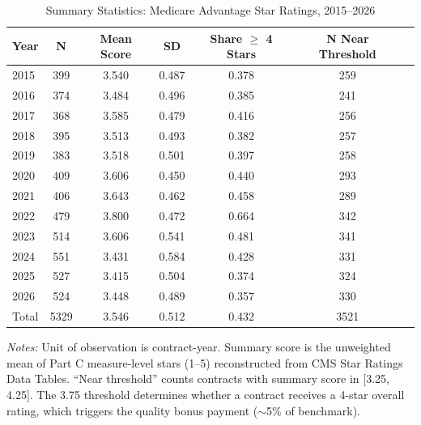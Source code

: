 \begin{table}[t]
\centering
\caption{Summary Statistics: Medicare Advantage Star Ratings, 2015--2026}
\label{tab:summary}
\begin{threeparttable}
\begin{tabular}{lcccccc}
\hline\hline
Year & N & Mean Score & SD & Share $\geq$ 4 Stars & N Near Threshold \\
\hline
2015 & 399 & 3.540 & 0.487 & 0.378 & 259 \\
2016 & 374 & 3.484 & 0.496 & 0.385 & 241 \\
2017 & 368 & 3.585 & 0.479 & 0.416 & 256 \\
2018 & 395 & 3.513 & 0.493 & 0.382 & 257 \\
2019 & 383 & 3.518 & 0.501 & 0.397 & 258 \\
2020 & 409 & 3.606 & 0.450 & 0.440 & 293 \\
2021 & 406 & 3.643 & 0.462 & 0.458 & 289 \\
2022 & 479 & 3.800 & 0.472 & 0.664 & 342 \\
2023 & 514 & 3.606 & 0.541 & 0.481 & 341 \\
2024 & 551 & 3.431 & 0.584 & 0.428 & 331 \\
2025 & 527 & 3.415 & 0.504 & 0.374 & 324 \\
2026 & 524 & 3.448 & 0.489 & 0.357 & 330 \\
\hline
Total & 5329 & 3.546 & 0.512 & 0.432 & 3521 \\
\hline\hline
\end{tabular}
\begin{tablenotes}
\item \textit{Notes:} Unit of observation is contract-year. Summary score is the unweighted mean
of Part C measure-level stars (1--5) reconstructed from CMS Star Ratings Data Tables.
``Near threshold'' counts contracts with summary score in [3.25, 4.25]. The 3.75
threshold determines whether a contract receives a 4-star overall rating, which triggers
the quality bonus payment ($\sim$5\% of benchmark).
\end{tablenotes}
\end{threeparttable}
\end{table}
